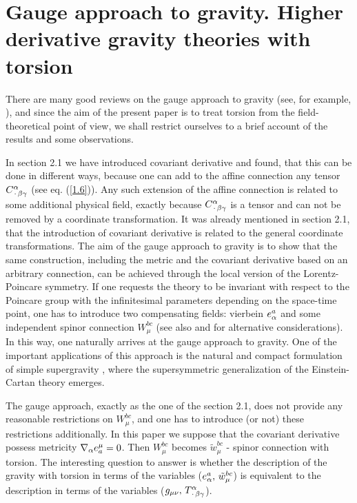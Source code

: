 \section{Gauge approach to gravity. Higher derivative
gravity theories with torsion}

There are many good reviews on the gauge approach to gravity
(see, for example, \cite{hehl}), and since the aim of the present 
paper is to treat torsion from the field-theoretical point of
view, we shall restrict ourselves to a brief account of the results 
and some observations. 

In section 2.1 we have
introduced covariant derivative and found, that this can be done
in different ways, because one can add to the affine connection any 
tensor $C^\alpha_{\,\cdot\,\beta\gamma}$ (see eq. (\ref{1.6})). Any such 
extension of the affine connection is 
related to some additional physical field, exactly because 
$C^\alpha_{\,\cdot\,\beta\gamma}$ is a tensor and can not be removed by a
coordinate transformation. It was already mentioned in section 2.1, 
that the introduction of covariant 
derivative is related to the general coordinate transformations. 
The aim of the gauge approach to gravity is to show that the 
same construction, including the metric and the covariant derivative 
based on an arbitrary connection, can be achieved through the local 
version of the Lorentz-Poincare symmetry. If one requests
the theory to be invariant with respect to the Poincare group with 
the infinitesimal parameters depending on the space-time point,
one has to introduce two compensating fields: vierbein $e_\alpha^a$ 
and some independent spinor connection $W^{bc}_\mu$  
\cite{utiama,kibble,hehl,hehl-review} (see also \cite{kubo,book}
and \cite{tse82,niew,ivansard,pobaob,GSW} for alternative
considerations). In this way, one naturally arrives at the gauge 
approach to gravity. One of the important applications of this 
approach is the natural and compact formulation of simple 
supergravity \cite{dezu}, where the supersymmetric generalization 
of the Einstein-Cartan theory emerges. 

The gauge approach, exactly as the one of the section 2.1,
does not provide any reasonable restrictions on $W^{bc}_\mu$, and 
one has to introduce (or not) these restrictions additionally. 
In this paper we suppose that the covariant derivative possess
metricity $\nabla_\alpha e^\mu_a=0$. Then $W^{bc}_\mu$ becomes 
${\tilde w}^{bc}_\mu$ - spinor connection with torsion. 
The interesting question to 
answer is whether the description of the gravity with torsion 
in terms of the variables ($e_\alpha^a,\,{\tilde w}^{bc}_\mu$) 
is equivalent to the description in terms of the variables
($g_{\mu\nu},\,T^\alpha_{\,\cdot\,\beta\gamma}$). 


